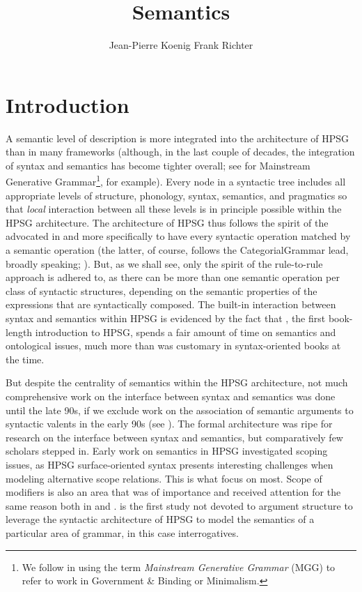 \documentclass[output=paper,biblatex,babelshorthands,newtxmath,draftmode,colorlinks,citecolor=brown]{langscibook}
\author{Jean-Pierre Koenig\affiliation{University at Buffalo} \lastand Frank Richter\affiliation{Goethe Universität Frankfurt}}
\title{Semantics}
\begin{document}
\maketitle
\label{chap-semantics}

\section{Introduction} 

A semantic level of description is more integrated into the architecture of HPSG
than in many frameworks (although, in the last couple of decades, the integration of syntax and
semantics has become tighter overall; see \citealt{HeimandKratzer1998} for Mainstream Generative
Grammar\footnote{ We follow \citet[]{CJ2005a} in using the term \emph{Mainstream Generative
    Grammar} (MGG) to refer to work in Government \& Binding or Minimalism.}, for example). Every
node in a syntactic tree includes all appropriate levels of structure, phonology, syntax, semantics,
and pragmatics so that \emph{local} interaction between all these levels is in principle possible
within the HPSG architecture. The architecture of HPSG thus follows the spirit of the
 advocated in \citet{Bach1976} and more specifically
\citet{KleinandSag1985} to have every syntactic operation matched by a semantic operation (the
latter, of course, follows the Categorial\indexcg Grammar lead, broadly speaking;
\citealt{Ajdukiewicz35a-u,Pollard84a-u,Steedman2000a-u}). But, as we shall see, only the spirit of
the rule-to-rule approach is adhered to, as there can be more than one semantic operation per class
of syntactic structures, depending on the semantic properties of the expressions that are
syntactically composed. The built-in interaction between syntax and semantics within HPSG is
evidenced by the fact that \citet{PollardandSag1987}, the first book-length introduction to HPSG,
spends a fair amount of time on semantics and ontological issues, much more than was customary in
syntax-oriented books at the time.

But despite the centrality of semantics within the HPSG architecture, not much comprehensive work on
the interface between syntax and semantics was done until the late 90s, if we exclude work on the
association of semantic arguments to syntactic valents in the early 90s (see
). The formal architecture was ripe for research on the interface between
syntax and semantics, but comparatively few scholars stepped in.  Early work on semantics in HPSG
investigated scoping issues, as HPSG surface-oriented syntax presents interesting challenges when
modeling alternative scope relations. This is what \citet{PollardandSag1987, PollardandSag1994}
focus on most. Scope of modifiers is also an area that was of importance and received attention for
the same reason both in \citet{PollardandSag1994} and \citet{Kasper1997}. 
is the first study not devoted to argument structure to leverage the syntactic architecture of HPSG
to model the semantics of a particular area of grammar, in this case interrogatives.
\end{document}
